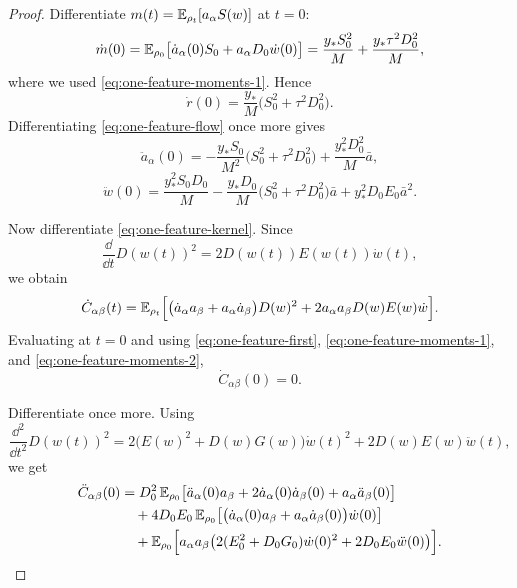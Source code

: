 \begin{proof}
Differentiate $m(t)=\mathbb{E}_{\rho_t}[a_\alpha S(w)]$ at $t=0$:
\[
  \dot m(0)
  =
  \mathbb{E}_{\rho_0}\bigl[\dot a_\alpha(0)S_0 + a_\alpha D_0 \dot w(0)\bigr]
  =
  \frac{y_*S_0^2}{M}
  +
  \frac{y_*\tau^2 D_0^2}{M},
\]
where we used \eqref{eq:one-feature-moments-1}.
Hence
\begin{equation}
  \dot r(0)=\frac{y_*}{M}\bigl(S_0^2+\tau^2 D_0^2\bigr).
  \label{eq:one-feature-rdot}
\end{equation}
Differentiating \eqref{eq:one-feature-flow} once more gives
\begin{equation}
  \ddot a_\alpha(0)
  =
  -\frac{y_*S_0}{M^2}\bigl(S_0^2+\tau^2 D_0^2\bigr)
  +
  \frac{y_*^2 D_0^2}{M}\bar a,
  \label{eq:one-feature-addot}
\end{equation}
\begin{equation}
  \ddot w(0)
  =
  \frac{y_*^2 S_0 D_0}{M}
  -
  \frac{y_*D_0}{M}\bigl(S_0^2+\tau^2 D_0^2\bigr)\bar a
  +
  y_*^2 D_0 E_0 \bar a^2.
  \label{eq:one-feature-wddot}
\end{equation}

Now differentiate \eqref{eq:one-feature-kernel}.
Since
\[
  \frac{\dd}{\dd t} D(w(t))^2 = 2D(w(t))E(w(t))\dot w(t),
\]
we obtain
\[
  \dot C_{\alpha\beta}(t)
  =
  \mathbb{E}_{\rho_t}
  \Bigl[
    \bigl(\dot a_\alpha a_\beta + a_\alpha \dot a_\beta\bigr)D(w)^2
    +
    2a_\alpha a_\beta D(w)E(w)\dot w
  \Bigr].
\]
Evaluating at $t=0$ and using \eqref{eq:one-feature-first}, \eqref{eq:one-feature-moments-1}, and \eqref{eq:one-feature-moments-2},
\[
  \dot C_{\alpha\beta}(0)=0.
  \label{eq:one-feature-first-zero}
\]

Differentiate once more.
Using
\[
  \frac{\dd^2}{\dd t^2} D(w(t))^2
  =
  2\bigl(E(w)^2+D(w)G(w)\bigr)\dot w(t)^2
  +
  2D(w)E(w)\ddot w(t),
\]
we get
\begin{align}
  \ddot C_{\alpha\beta}(0)
  &=
  D_0^2\,
  \mathbb{E}_{\rho_0}
  \bigl[
    \ddot a_\alpha(0)a_\beta
    +
    2\dot a_\alpha(0)\dot a_\beta(0)
    +
    a_\alpha \ddot a_\beta(0)
  \bigr]
  \nonumber\\
  &\quad
  +
  4D_0E_0\,
  \mathbb{E}_{\rho_0}
  \bigl[
    \bigl(\dot a_\alpha(0)a_\beta+a_\alpha \dot a_\beta(0)\bigr)\dot w(0)
  \bigr]
  \nonumber\\
  &\quad
  +
  \mathbb{E}_{\rho_0}
  \Bigl[
    a_\alpha a_\beta
    \bigl(
      2(E_0^2+D_0G_0)\dot w(0)^2
      +
      2D_0E_0\ddot w(0)
    \bigr)
  \Bigr].
  \label{eq:one-feature-second-start}
\end{align}


\end{proof}
